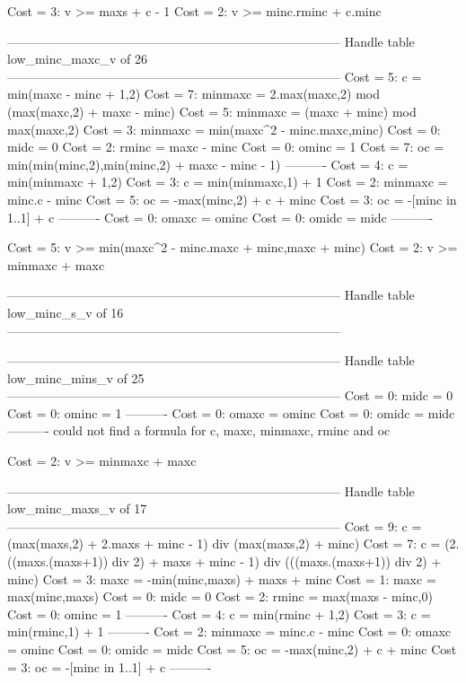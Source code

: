 Cost =  3:  v >= maxs + c - 1
Cost =  2:  v >= minc.rminc + c.minc

--------------------------------------------------------------------------------
Handle table low_minc_maxc_v of 26
--------------------------------------------------------------------------------
Cost =  5:  c       = min(maxc - minc + 1,2)
Cost =  7:  minmaxc = 2.max(maxc,2) mod (max(maxc,2) + maxc - minc)
Cost =  5:  minmaxc = (maxc + minc) mod max(maxc,2)
Cost =  3:  minmaxc = min(maxc^2 - minc.maxc,minc)
Cost =  0:  midc    = 0
Cost =  2:  rminc   = maxc - minc
Cost =  0:  ominc   = 1
Cost =  7:  oc      = min(min(minc,2),min(minc,2) + maxc - minc - 1)
----------
Cost =  4:  c       = min(minmaxc + 1,2)
Cost =  3:  c       = min(minmaxc,1) + 1
Cost =  2:  minmaxc = minc.c - minc
Cost =  5:  oc      = -max(minc,2) + c + minc
Cost =  3:  oc      = -[minc in 1..1] + c
----------
Cost =  0:  omaxc   = ominc
Cost =  0:  omidc   = midc
----------

Cost =  5:  v >= min(maxc^2 - minc.maxc + minc,maxc + minc)
Cost =  2:  v >= minmaxc + maxc

--------------------------------------------------------------------------------
Handle table low_minc_s_v of 16
--------------------------------------------------------------------------------


--------------------------------------------------------------------------------
Handle table low_minc_mins_v of 25
--------------------------------------------------------------------------------
Cost =  0:  midc    = 0
Cost =  0:  ominc   = 1
----------
Cost =  0:  omaxc   = ominc
Cost =  0:  omidc   = midc
----------
could not find a formula for c, maxc, minmaxc, rminc and oc

Cost =  2:  v >= minmaxc + maxc

--------------------------------------------------------------------------------
Handle table low_minc_maxs_v of 17
--------------------------------------------------------------------------------
Cost =  9:  c       = (max(maxs,2) + 2.maxs + minc - 1) div (max(maxs,2) + minc)
Cost =  7:  c       = (2.((maxs.(maxs+1)) div 2) + maxs + minc - 1) div (((maxs.(maxs+1)) div 2) + minc)
Cost =  3:  maxc    = -min(minc,maxs) + maxs + minc
Cost =  1:  maxc    = max(minc,maxs)
Cost =  0:  midc    = 0
Cost =  2:  rminc   = max(maxs - minc,0)
Cost =  0:  ominc   = 1
----------
Cost =  4:  c       = min(rminc + 1,2)
Cost =  3:  c       = min(rminc,1) + 1
----------
Cost =  2:  minmaxc = minc.c - minc
Cost =  0:  omaxc   = ominc
Cost =  0:  omidc   = midc
Cost =  5:  oc      = -max(minc,2) + c + minc
Cost =  3:  oc      = -[minc in 1..1] + c
----------


